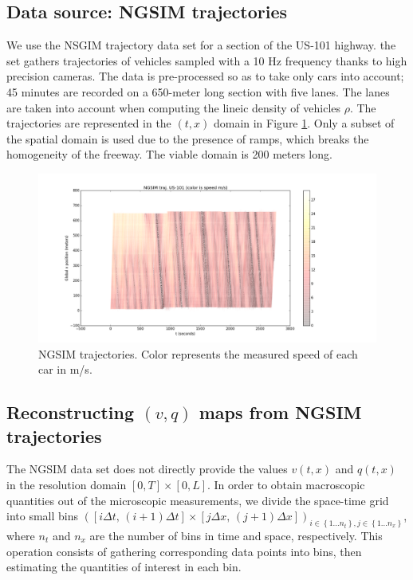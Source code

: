 \documentclass[preprint]{elsarticle}
\begin{document}
\subsection{Data source: NGSIM trajectories}

We use the NSGIM trajectory data set for a section of the US-101 highway. the set gathers trajectories of vehicles sampled with a 10 Hz frequency thanks to high precision cameras. The data is pre-processed so as to take only cars into account; 45 minutes are recorded on a 650-meter long section with five lanes. The lanes are taken into account when computing the lineic density of vehicles $\rho$.
The trajectories are represented in the $(t,x)$ domain
in Figure \ref{fig:NGSIM-trajectories}.
Only a subset of the spatial domain is used due to the presence of ramps, which breaks the homogeneity of the freeway. The viable domain is 200 meters long.

\begin{figure}[H]
\centering
\includegraphics[width=12cm]{Numerics/US-101_all_traj_low_res}
\protect\caption{NGSIM trajectories. Color represents the measured speed of each
car in m/s.}
\label{fig:NGSIM-trajectories}
\end{figure}



\subsection{Reconstructing $(v,q)$ maps from NGSIM trajectories}

The NGSIM data set does not directly provide the values $v(t,x)$
and $q(t,x)$ in the resolution domain $\left[0,T\right]\times\left[0,L\right]$.
In order to obtain macroscopic quantities out of the microscopic measurements,
we divide the space-time grid
into small bins $\left(\left[i\Delta t,\, \left(i+1\right)\Delta t\right]\times\left[j\Delta x, \, (j+1)\Delta x\right]\right)_{i\in\left\{ 1\ldots n_{t}\right\} ,j\in\left\{ 1\ldots n_{x}\right\} }$, where $n_t$ and $n_x$ are the number of bins in time and space, respectively. This operation consists of gathering corresponding data points into bins, then estimating the quantities of interest in each bin. 
\end{document}
